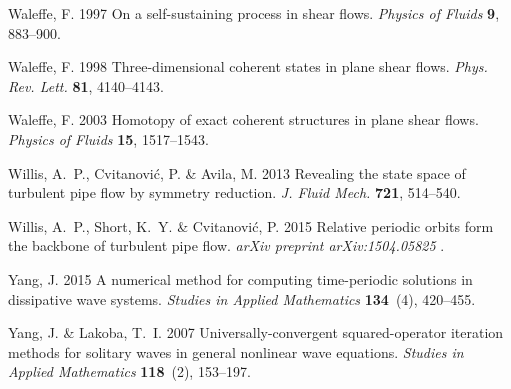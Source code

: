 \documentclass{jfm}
\begin{document}
\begin{thebibliography}{68}
{\sc Waleffe, F.} 1997 On a self-sustaining process in shear flows. {\em
  Physics of Fluids\/} {\bf 9}, 883--900.

{\sc Waleffe, F.} 1998 Three-dimensional coherent states in plane shear flows.
  {\em Phys. Rev. Lett.\/} {\bf 81}, 4140--4143.

{\sc Waleffe, F.} 2003 Homotopy of exact coherent structures in plane shear
  flows. {\em Physics of Fluids\/} {\bf 15}, 1517--1543.

{\sc Willis, A.~P., Cvitanovi{\'c}, P. \& Avila, M.} 2013 Revealing the state
  space of turbulent pipe flow by symmetry reduction. {\em J. Fluid Mech.\/}
  {\bf 721}, 514--540.

{\sc Willis, A.~P., Short, K.~Y. \& Cvitanovi{\'c}, P.} 2015 Relative periodic
  orbits form the backbone of turbulent pipe flow. {\em arXiv preprint
  arXiv:1504.05825\/} .

{\sc Yang, J.} 2015 A numerical method for computing time-periodic solutions in
  dissipative wave systems. {\em Studies in Applied Mathematics\/} {\bf
  134}~(4), 420--455.

{\sc Yang, J. \& Lakoba, T.~I.} 2007 Universally-convergent squared-operator
  iteration methods for solitary waves in general nonlinear wave equations.
  {\em Studies in Applied Mathematics\/} {\bf 118}~(2), 153--197.

\end{thebibliography}


%    
\end{document}
